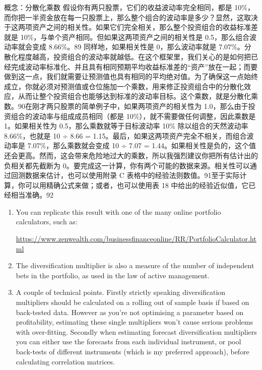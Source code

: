 \begin{chineseblock}概念：分散化乘数 假设你有两只股票，它们的收益波动率完全相同，都是 10\%，而你把一半资金放在每一只股票上，那么整个组合的波动率是多少？显然，这取决于这两项资产之间的相关性。如果它们完全相关，那么整个投资组合的收益标准差就是 10\%，与单个资产相同。但如果这两项资产之间的相关性是 0.5，那么组合波动率就会变成 8.66\%。89 同样地，如果相关性是 0，那么波动率就是 7.07\%。分散化程度越高，投资组合的波动率就越低。在这个框架里，我们关心的是如何把已经完成波动率标准化、并且具有相同预期平均收益标准差的“资产”放在一起；而要做到这一点，我们就需要让预测值也具有相同的平均绝对值。为了确保这一点始终成立，你就必须对预测值或仓位施加一个乘数，用来修正投资组合中的分散化效应，从而让整个投资组合也能够达到标准的波动率目标。这个乘数，就是分散化乘数。90在刚才两只股票的简单例子中，如果两项资产的相关性为 1.0，那么由于投资组合的波动率与组成成员相同（都是 10\%），就不需要做任何调整，因此乘数是 1。如果相关性为 0.5，那么乘数就等于目标波动率 10\% 除以组合的天然波动率 8.66\%，也就是 10 ÷ 8.66 = 1.15。最后，如果这两项资产完全不相关，而组合波动率是 7.07\%，那么乘数就会变成 10 ÷ 7.07 = 1.44。如果相关性是负的，这个值还会更高。然而，这会带来危险地过大的乘数，所以我强烈建议你把所有估计出的负相关都先截断为 0。要完成这一计算，你有两个可能的数据来源。相关性可以通过回测数据来估计，也可以使用附录 C 表格中的经验法则数值。91至于实际计算，你可以用精确公式来做；或者，也可以使用表 18 中给出的经验近似值，它已经相当准确。92 \end{chineseblock}

\begin{enumerate}
\item You can replicate this result with one of the many online portfolio calculators, such as:
\par {\footnotesize\url{https://www.zenwealth.com/businessfinanceonline/RR/PortfolioCalculator.html}}
\item The diversification multiplier is also a measure of the number of independent bets in the portfolio, as used in the law of active management.
\item A couple of technical points. Firstly strictly speaking diversification multipliers should be calculated on a rolling out of sample basis if based on back-tested data. However as you're not optimising a parameter based on profitability, estimating these single multipliers won't cause serious problems with over-fitting. Secondly when estimating forecast diversification multipliers you can either use the forecasts from each individual instrument, or pool back-tests of different instruments (which is my preferred approach), before calculating correlation matrices. \end{enumerate}

